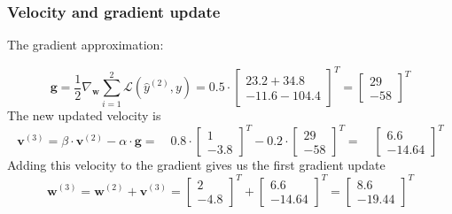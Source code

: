 \documentclass[addpoints]{exam}
\begin{document}
		\subsubsection{Velocity and gradient update}
		The gradient approximation:
		
		\begin{equation}
			\textbf{g} = \frac{1}{2} \nabla_{\textbf{w}}{\sum_{i = 1}^{2}\mathscr{L}(\hat{{y}}^{(2)},y)} = 0.5 \cdot\begin{bmatrix}
				23.2+34.8 \\-11.6-104.4
				
			\end{bmatrix}^{T} = \begin{bmatrix}
				29 \\-58
				
			\end{bmatrix}^{T}
		\end{equation}
		The new updated velocity is 
		\begin{equation}
			\textbf{v}^{(3)} = \beta \cdot \textbf{v}^{(2)} - \alpha \cdot \textbf{g} = \quad  0.8\cdot \begin{bmatrix}
				1 \\-3.8
				
			\end{bmatrix}^{T}- 0.2 \cdot \begin{bmatrix}
				29\\-58
				
			\end{bmatrix}^{T} = \quad  \begin{bmatrix}
				6.6 \\-14.64
				
			\end{bmatrix}^{T}
		\end{equation}
		Adding this velocity to the gradient gives us the first gradient update
		\begin{equation}
			\textbf{w}^{(3)} = \textbf{w}^{(2)} + \textbf{v}^{(3)} = \begin{bmatrix}
				2 \\-4.8
				
			\end{bmatrix}^{T} +  \begin{bmatrix}
				6.6 \\-14.64
				
			\end{bmatrix}^{T} =  \begin{bmatrix}
				8.6 \\-19.44
				
			\end{bmatrix}^{T}
		\end{equation}
\end{document}
